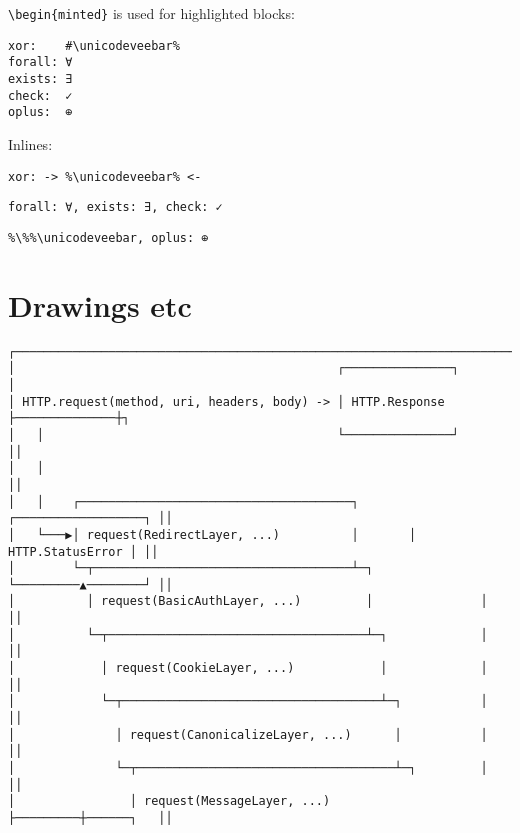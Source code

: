 \texttt{{\textbackslash}begin\{minted\}} is used for highlighted blocks:




\begin{lstlisting}[escapeinside=\#\%,]
xor:    #\unicodeveebar%
forall: ∀
exists: ∃
check:  ✓
oplus:  ⊕
\end{lstlisting}



Inlines:



\texttt{xor:    \unicodeveebar{}  -> \%{\textbackslash}unicodeveebar\% <-}



\texttt{forall: ∀, exists: ∃, check:  ✓}



\texttt{\%{\textbackslash}\%\%{\textbackslash}unicodeveebar, oplus:  ⊕}



\section{Drawings etc}



\label{4569512277787935494}{}



\begin{lstlisting}[]
┌────────────────────────────────────────────────────────────────────────────┐
│                                             ┌───────────────┐              │
│ HTTP.request(method, uri, headers, body) -> │ HTTP.Response ├──────────────┼┐
│   │                                         └───────────────┘              ││
│   │                                                                        ││
│   │    ┌──────────────────────────────────────┐       ┌──────────────────┐ ││
│   └───▶│ request(RedirectLayer, ...)          │       │ HTTP.StatusError │ ││
│        └─┬────────────────────────────────────┴─┐     └─────────▲────────┘ ││
│          │ request(BasicAuthLayer, ...)         │               │          ││
│          └─┬────────────────────────────────────┴─┐             │          ││
│            │ request(CookieLayer, ...)            │             │          ││
│            └─┬────────────────────────────────────┴─┐           │          ││
│              │ request(CanonicalizeLayer, ...)      │           │          ││
│              └─┬────────────────────────────────────┴─┐         │          ││
│                │ request(MessageLayer, ...)           ├─────────┼──────┐   ││
\end{lstlisting}




